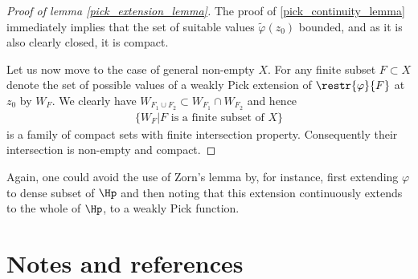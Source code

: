 \begin{proof}[Proof of lemma \ref{pick_extension_lemma}]
	The proof of \ref{pick_continuity_lemma} immediately implies that the set of suitable values $\tilde{\varphi}(z_{0})$ bounded, and as it is also clearly closed, it is compact.

	Let us now move to the case of general non-empty $X$. For any finite subset $F \subset X$ denote the set of possible values of a weakly Pick extension of $\restr{\varphi}{F}$ at $z_{0}$ by $W_{F}$. We clearly have $W_{F_{1} \cup F_{2}} \subset W_{F_{1}} \cap W_{F_{2}}$ and hence
	\begin{align*}
		\{ W_{F} | \text{$F$ is a finite subset of $X$}\}
	\end{align*}
	is a family of compact sets with finite intersection property. Consequently their intersection is non-empty and compact.
\end{proof}

Again, one could avoid the use of Zorn's lemma by, for instance, first extending $\varphi$ to dense subset of $\Hp$ and then noting that this extension continuously extends to the whole of $\Hp$, to a weakly Pick function.


\section{Notes and references}

\begin{comment}

TODO:
\begin{itemize}
	\item Examples of representing measures behind functions and functions behind representing measures
	\item Spectral commutant lifting theorem
	\item Use Morera's theorem to prove weak Hindmarsh's theorem
	\item Nice formula for finite Pick extension (rational function case)
\end{itemize}

\end{comment}






